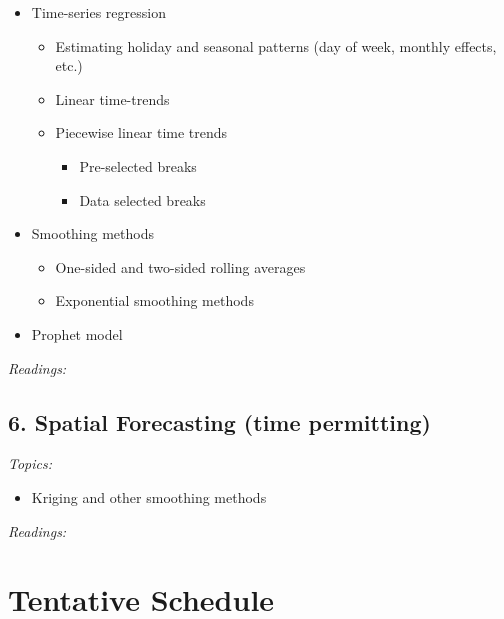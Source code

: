 \documentclass[12pt]{article}
\begin{document}
\begin{itemize}
  \item Time-series regression

  \begin{itemize}
    \item Estimating holiday and seasonal patterns (day of week, monthly effects, etc.)
    
    \item Linear time-trends
    
    \item Piecewise linear time trends
    \begin{itemize}
      \item Pre-selected breaks
      \item Data selected breaks
    \end{itemize}
  \end{itemize}

  \item Smoothing methods
  \begin{itemize}
    \item One-sided and two-sided rolling averages
    \item Exponential smoothing methods
  \end{itemize}

  \item Prophet model
\end{itemize}

\bigskip
\noindent\emph{Readings:}


\subsection*{6. Spatial Forecasting (time permitting)}

\noindent\emph{Topics:}

\begin{itemize}
  \item Kriging and other smoothing methods
\end{itemize}

\bigskip
\noindent\emph{Readings:}



\newpage
\section*{Tentative Schedule}




\end{document}
